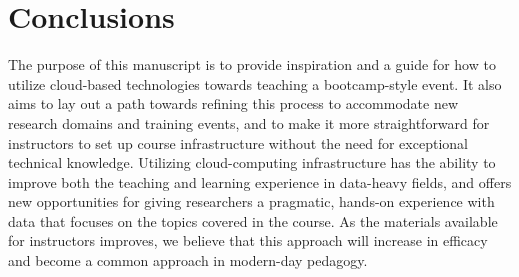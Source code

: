 \section{Conclusions}

The purpose of this manuscript is to provide inspiration
and a guide for how to utilize cloud-based technologies towards teaching a
bootcamp-style event. It also aims to lay out a path towards refining this
process to accommodate new research domains and training events, and to make it
more straightforward for instructors to set up course infrastructure without the
need for exceptional technical knowledge. Utilizing cloud-computing
infrastructure has the ability to improve both the teaching and learning
experience in data-heavy fields, and offers new opportunities for giving
researchers a pragmatic, hands-on experience with data that focuses on the
topics covered in the course. As the materials available for instructors
improves, we believe that this approach will increase in efficacy and become a
common approach in modern-day pedagogy.
